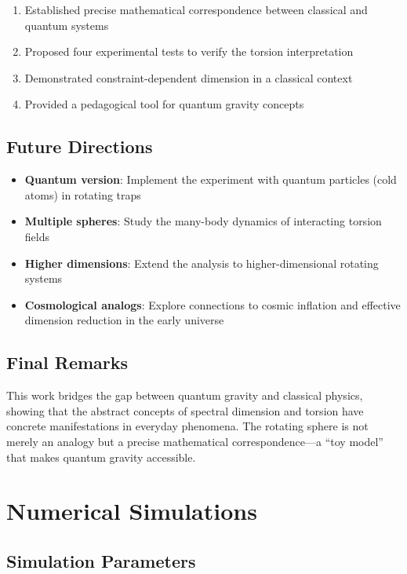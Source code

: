 \documentclass[UTF8]{ctex}\n\documentclass[12pt,a4paper]{article}
\begin{document}
\begin{enumerate}
    \item Established precise mathematical correspondence between classical and quantum systems
    \item Proposed four experimental tests to verify the torsion interpretation
    \item Demonstrated constraint-dependent dimension in a classical context
    \item Provided a pedagogical tool for quantum gravity concepts
\end{enumerate}

\subsection{Future Directions}

\begin{itemize}
    \item \textbf{Quantum version}: Implement the experiment with quantum particles (cold atoms) in rotating traps
    \item \textbf{Multiple spheres}: Study the many-body dynamics of interacting torsion fields
    \item \textbf{Higher dimensions}: Extend the analysis to higher-dimensional rotating systems
    \item \textbf{Cosmological analogs}: Explore connections to cosmic inflation and effective dimension reduction in the early universe
\end{itemize}

\subsection{Final Remarks}

This work bridges the gap between quantum gravity and classical physics, showing that the abstract concepts of spectral dimension and torsion have concrete manifestations in everyday phenomena. The rotating sphere is not merely an analogy but a precise mathematical correspondence---a ``toy model'' that makes quantum gravity accessible.

\appendix

\section{Numerical Simulations}
\label{app:numerical}

\subsection{Simulation Parameters}
\end{document}
